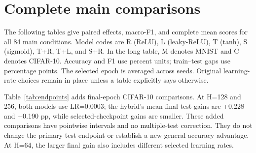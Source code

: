 \documentclass[10pt]{article}
\begin{document}



\clearpage
\appendix
\section{Complete main comparisons}\label{app:main}
The following tables give paired effects, macro-F1, and complete mean scores for all 84 main conditions. Model codes are R (ReLU), L (leaky-ReLU), T (tanh), S (sigmoid), T+R, T+L, and S+R. In the long table, M denotes MNIST and C denotes CIFAR-10. Accuracy and F1 use percent units; train--test gaps use percentage points. The selected epoch is averaged across seeds. Original learning-rate choices remain in place unless a table explicitly says otherwise.


Table~\ref{tab:endpoints} adds final-epoch CIFAR-10 comparisons. At H=128 and 256, both models use LR=0.0003; the hybrid's mean final test gains are +0.228 and +0.190 pp, while selected-checkpoint gains are smaller. These added comparisons have pointwise intervals and no multiple-test correction. They do not change the primary test endpoint or establish a new general accuracy advantage. At H=64, the larger final gain also includes different selected learning rates.



\FloatBarrier


\clearpage
\end{document}
